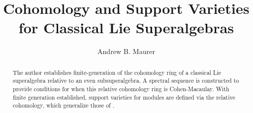 \documentclass[12pt]{report}
\title{Cohomology and Support Varieties\\
  for Classical Lie Superalgebras}
\author{Andrew B. Maurer}
\begin{document}

\begin{abstract}  
The author establishes finite-generation of the cohomology ring of a classical Lie superalgebra relative to an even subsuperalgebra. A spectral sequence is constructed to provide conditions for when this relative cohomology ring is Cohen-Macaulay. With finite generation established, support varieties for modules are defined via the relative cohomology, which generalize those of \cite{BKN-1}.




\end{abstract}

\maketitle    %



\end{document}
